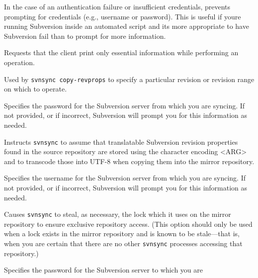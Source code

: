 \begin{description}
In the case of an authentication failure or insufficient credentials,
prevents prompting for credentials (e.g., username or password). This is
useful if you\textquotesingle re running Subversion inside an automated
script and it\textquotesingle s more appropriate to have Subversion fail
than to prompt for more information.
\item[\protect\phantomsection\label{svn.ref.svnsync.sw.quiet}{}\texttt{-\/-quiet}
(\texttt{-q})]
Requests that the client print only essential information while
performing an operation.
\item[\protect\phantomsection\label{svn.ref.svnsync.sw.revision}{}\texttt{-\/-revision}
(\texttt{-r}) \textless ARG\textgreater{}]
Used by \texttt{svnsync\ copy-revprops} to specify a particular revision
or revision range on which to operate.
\item[\protect\phantomsection\label{svn.ref.svnsync.sw.source_password}{}\texttt{-\/-source-password}
\textless PASSWD\textgreater{}]
Specifies the password for the Subversion server from which you are
syncing. If not provided, or if incorrect, Subversion will prompt you
for this information as needed.
\item[\protect\phantomsection\label{svn.ref.svnsync.sw.source_prop_encoding}{}\texttt{-\/-source-prop-encoding\ ARG}]
Instructs \texttt{svnsync} to assume that translatable Subversion
revision properties found in the source repository are stored using the
character encoding \textless ARG\textgreater{} and to transcode those
into UTF-8 when copying them into the mirror repository.
\item[\protect\phantomsection\label{svn.ref.svnsync.sw.source_username}{}\texttt{-\/-source-username}
\textless NAME\textgreater{}]
Specifies the username for the Subversion server from which you are
syncing. If not provided, or if incorrect, Subversion will prompt you
for this information as needed.
\item[\protect\phantomsection\label{svn.ref.svnsync.sw.steal_lock}{}\texttt{-\/-steal-lock}]
Causes \texttt{svnsync} to steal, as necessary, the lock which it uses
on the mirror repository to ensure exclusive repository access. (This
option should only be used when a lock exists in the mirror repository
and is known to be stale---that is, when you are certain that there are
no other \texttt{svnsync} processes accessing that repository.)
\item[\protect\phantomsection\label{svn.ref.svnsync.sw.sync_password}{}\texttt{-\/-sync-password}
\textless PASSWD\textgreater{}]
Specifies the password for the Subversion server to which you are

\end{description}
